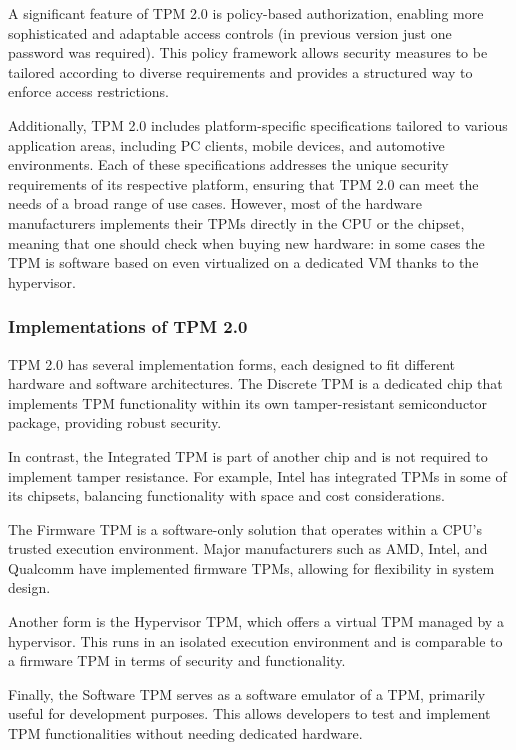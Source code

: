 A significant feature of TPM 2.0 is policy-based authorization,
enabling more sophisticated and adaptable access controls (in previous
version just one password was required). This policy
framework allows security measures to be tailored according to diverse
requirements and provides a structured way to enforce access
restrictions.

Additionally, TPM 2.0 includes platform-specific specifications
tailored to various application areas, including PC clients, mobile
devices, and automotive environments. Each of these specifications
addresses the unique security requirements of its respective platform,
ensuring that TPM 2.0 can meet the needs of a broad range of use
cases. However, most of the hardware manufacturers implements their
TPMs directly in the CPU or the chipset, meaning that one should check
when buying new hardware: in some cases the TPM is software based on
even virtualized on a dedicated VM thanks to the hypervisor.


\subsubsection{Implementations of TPM 2.0}

TPM 2.0 has several implementation forms, each designed to fit
different hardware and software architectures. The Discrete TPM is a
dedicated chip that implements TPM functionality within its own
tamper-resistant semiconductor package, providing robust security.

In contrast, the Integrated TPM is part of another chip and is not
required to implement tamper resistance. For example, Intel has
integrated TPMs in some of its chipsets, balancing functionality with
space and cost considerations.

The Firmware TPM is a software-only solution that operates within a
CPU's trusted execution environment. Major manufacturers such as AMD,
Intel, and Qualcomm have implemented firmware TPMs, allowing for
flexibility in system design.

Another form is the Hypervisor TPM, which offers a virtual TPM managed
by a hypervisor. This runs in an isolated execution environment and is
comparable to a firmware TPM in terms of security and functionality.

Finally, the Software TPM serves as a software emulator of a TPM,
primarily useful for development purposes. This allows developers to
test and implement TPM functionalities without needing dedicated
hardware.

